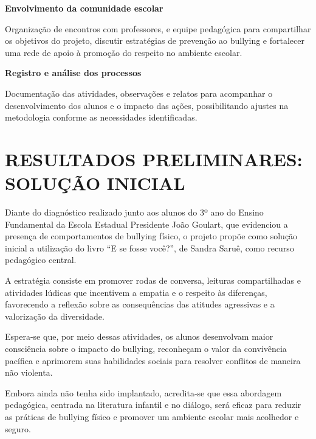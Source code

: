 \textbf{Envolvimento da comunidade escolar}

Organização de encontros com professores, e equipe pedagógica para compartilhar os objetivos do projeto, discutir estratégias de prevenção ao bullying e fortalecer uma rede de apoio à promoção do respeito no ambiente escolar.

\textbf{Registro e análise dos processos}

Documentação das atividades, observações e relatos para acompanhar o desenvolvimento dos alunos e o impacto das ações, possibilitando ajustes na metodologia conforme as necessidades identificadas.


\section{RESULTADOS PRELIMINARES: SOLUÇÃO INICIAL}

Diante do diagnóstico realizado junto aos alunos do 3º ano do Ensino Fundamental da Escola Estadual Presidente João Goulart, que evidenciou a presença de comportamentos de bullying físico, o projeto propõe como solução inicial a utilização do livro “E se fosse você?”, de Sandra Saruê, como recurso pedagógico central.

A estratégia consiste em promover rodas de conversa, leituras compartilhadas e atividades lúdicas que incentivem a empatia e o respeito às diferenças, favorecendo a reflexão sobre as consequências das atitudes agressivas e a valorização da diversidade.

Espera-se que, por meio dessas atividades, os alunos desenvolvam maior consciência sobre o impacto do bullying, reconheçam o valor da convivência pacífica e aprimorem suas habilidades sociais para resolver conflitos de maneira não violenta.

Embora ainda não tenha sido implantado, acredita-se que essa abordagem pedagógica, centrada na literatura infantil e no diálogo, será eficaz para reduzir as práticas de bullying físico e promover um ambiente escolar mais acolhedor e seguro.




%
